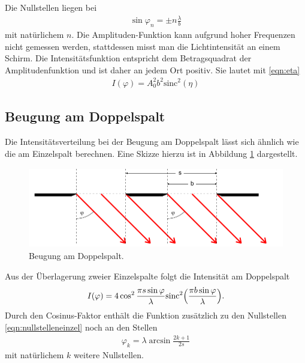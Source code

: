 \FloatBarrier

Die Nullstellen liegen bei
\begin{align}
  \sin{\varphi_n} = \pm n \frac{\lambda}{b}
  \label{eqn:nullstelleneinzel}
\end{align}
mit natürlichem $n$.
Die Amplituden-Funktion kann aufgrund hoher Frequenzen nicht gemessen werden,
stattdessen misst man die Lichtintensität an einem Schirm.
Die Intensitätsfunktion entspricht dem Betragsquadrat der Amplitudenfunktion
und ist daher an jedem Ort positiv.
Sie lautet mit \eqref{eqn:eta}
\begin{align}
  I(\varphi) = A_0^2 b^2 \text{sinc}^2(\eta)
  \label{eqn:intensitaeteinzel}
\end{align}


\subsection{Beugung am Doppelspalt}

Die Intensitätsverteilung bei der Beugung am Doppelspalt lässt sich ähnlich
wie die am Einzelspalt berechnen.
Eine Skizze hierzu ist in Abbildung \ref{fig:doppelspalt} dargestellt.

\begin{figure}
  \centering
  \includegraphics[height=3.5cm]{MeinePics/doppelspalt.png}
  \caption{Beugung am Doppelspalt.\cite{anleitung}}
  \label{fig:doppelspalt}
\end{figure}

\FloatBarrier

Aus der Überlagerung zweier Einzelspalte folgt die Intensität am Doppelspalt
\begin{align}
  I(\varphi) = 4 \cos^2{\frac{\pi s \sin{\varphi}}{\lambda}}
  \text{sinc}^2\Bigl(\frac{\pi b \sin{\varphi}}{\lambda}\Bigr).
\end{align}
Durch den Cosinus-Faktor enthält die Funktion zusätzlich zu den Nullstellen
\eqref{eqn:nullstelleneinzel} noch an den Stellen
\begin{align}
  \varphi_k = \lambda \arcsin{\frac{2k+1}{2s}}
\end{align}
mit natürlichem $k$ weitere Nullstellen.


